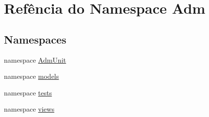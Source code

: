 \hypertarget{namespaceAdm}{\section{Refência do Namespace Adm}
\label{da/d8c/namespaceAdm}
}
\subsection*{Namespaces}
\begin{DoxyCompactItemize}
\item 
namespace \hyperlink{namespaceAdm_1_1AdmUnit}{Adm\-Unit}
\item 
namespace \hyperlink{namespaceAdm_1_1models}{models}
\item 
namespace \hyperlink{namespaceAdm_1_1tests}{tests}
\item 
namespace \hyperlink{namespaceAdm_1_1views}{views}
\end{DoxyCompactItemize}

